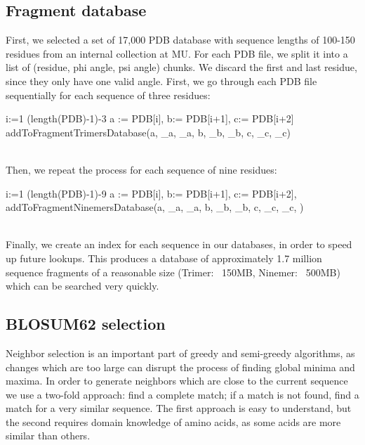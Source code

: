\documentclass{article}
\begin{document}
\begin{enumerate}
\section{Fragment database}

First, we selected a set of 17,000 PDB database with sequence lengths of 100-150 residues from an internal collection at MU.  For each PDB file, we split it into a list of (residue, phi angle, psi angle) chunks.  We discard the first and last residue, since they only have one valid angle.  First, we go through each PDB file sequentially for each sequence of three residues:
\begin{program}

  \FOR i:=1 \TO (length(PDB)-1)-3  \DO
	a := PDB[i], b:= PDB[i+1], c:= PDB[i+2]
     	addToFragmentTrimersDatabase(a, \phi_a, \psi_a, b, \phi_b, \psi_b, c, \phi_c, \psi_c)\\\\
\END
\end{program}

Then, we repeat the process for each sequence of nine residues:
\begin{program}
  \FOR i:=1 \TO (length(PDB)-1)-9  \DO
	a := PDB[i], b:= PDB[i+1], c:= PDB[i+2],  \dotso
	addToFragmentNinemersDatabase(a, \phi_a, \psi_a, b, \phi_b, \psi_b, c, \phi_c, \psi_c, \dotso)\\\\
\END
\end{program}

Finally, we create an index for each sequence in our databases, in order to speed up future lookups.  This produces a database of approximately 1.7 million sequence fragments of a reasonable size (Trimer: ~150MB, Ninemer: ~500MB) which can be searched very quickly.

\subsection{BLOSUM62 selection}

Neighbor selection is an important part of greedy and semi-greedy algorithms, as changes which are too large can disrupt the process of finding global minima and maxima. In order to generate neighbors which are close to the current sequence we use a two-fold approach: find a complete match; if a match is not found, find a match for a very similar sequence. The first approach is easy to understand, but the second requires domain knowledge of amino acids, as some acids are more similar than others.


\end{enumerate}
\end{document}
